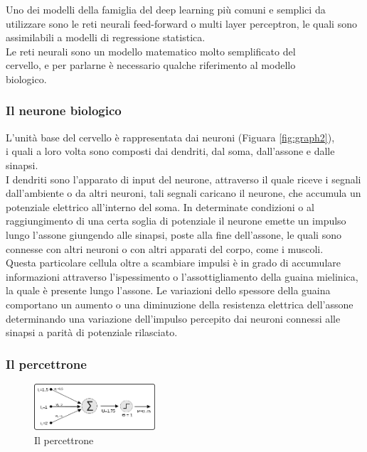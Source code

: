 \documentclass[10pt,a4paper]{article}
\begin{document}
Uno dei modelli della famiglia del deep learning più comuni e semplici da utilizzare sono le reti neurali feed-forward o multi layer perceptron, le quali sono assimilabili a modelli di regressione statistica.\\
Le reti neurali sono un modello matematico molto semplificato del\\ cervello, e per parlarne è necessario qualche riferimento al modello \\biologico.

\subsubsection*{Il neurone biologico}
L'unità base del cervello è rappresentata dai neuroni (Figuara \ref{fig:graph2}),\\ i quali a loro volta sono composti dai dendriti, dal soma, dall'assone e dalle sinapsi. 
\\I dendriti sono l'apparato di input del neurone, attraverso il quale riceve i segnali dall'ambiente o da altri neuroni, tali segnali caricano il neurone, che accumula un potenziale elettrico all'interno del soma.
In determinate condizioni o al raggiungimento di una certa soglia di potenziale il neurone emette un impulso lungo l'assone giungendo alle sinapsi, poste alla fine dell'assone, le quali sono connesse con altri neuroni o con altri apparati del corpo, come i muscoli.\\
Questa particolare cellula oltre a scambiare impulsi è in grado di accumulare informazioni attraverso l'ispessimento o l'assottigliamento della guaina mielinica, la quale è presente lungo l'assone.
Le variazioni dello spessore della guaina comportano un aumento o una diminuzione della resistenza elettrica dell'assone determinando una variazione dell'impulso percepito dai neuroni connessi alle sinapsi a parità di potenziale rilasciato.   

\subsubsection*{Il percettrone} 

\begin{figure}
	\centering
	\vspace{-15pt}
    \includegraphics[width=0.4\textwidth]{percettrone.png}
  	\caption{Il percettrone}
  	\label{fig:graph3}
\end{figure}
\end{document}
